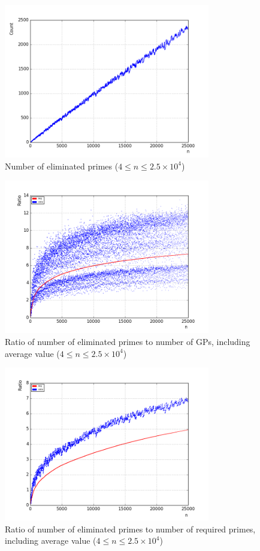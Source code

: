 \documentclass[10pt,twocolumn]{article}
\begin{document}
\begin{figure}[!ht]
\centering
\captionsetup{justification=centering}
\includegraphics[width=9cm]{f_number_of_eliminated_primes}
\caption[caption]{Number of eliminated primes ($4 \leq n \leq 2.5 \times 10^4$)}
\label{fig:numberofeliminatedprimes}
\end{figure}

\begin{figure}[!ht]
\centering
\captionsetup{justification=centering}
\includegraphics[width=9cm]{f_eliminated_primes_to_partitions}
\caption[caption]{Ratio of number of eliminated primes to number of GPs, including average value ($4 \leq n \leq 2.5 \times 10^4$)}
\label{fig:numberofeliminatedprimestopartitions}
\end{figure}

\begin{figure}[!ht]
\centering
\captionsetup{justification=centering}
\includegraphics[width=9cm]{f_eliminated_primes_to_req_primes}
\caption[caption]{Ratio of number of eliminated primes to number of required primes, including average value ($4 \leq n \leq 2.5 \times 10^4$)}
\label{fig:numberofeliminatedprimestorequiredprimes}
\end{figure}
\end{document}
